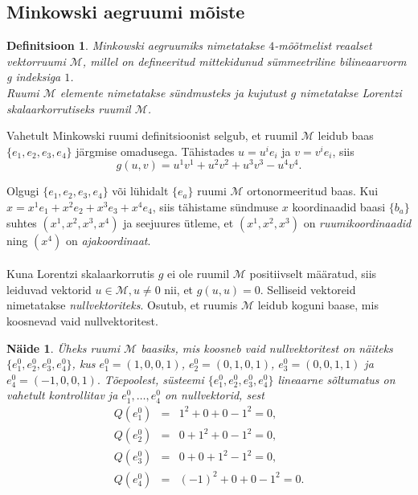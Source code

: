 \documentclass[a4paper,12pt]{article}
\newtheorem{definitsioon}{Definitsioon}[section]
\newtheorem{naide}{Näide}[section]
\numberwithin{equation}{section}
\begin{document}
\subsection{Minkowski aegruumi mõiste}

\begin{definitsioon}
\emph{Minkowski aegruumiks} nimetatakse $4$-mõõtmelist reaalset vektorruumi $\mathcal{M}$, millel on defineeritud mittekidunud sümmeetriline bilineaarvorm g indeksiga $1$. \\
Ruumi $\mathcal{M}$ elemente nimetatakse \emph{sündmusteks} ja kujutust $g$ nimetatakse \emph{Lorentzi skalaarkorrutiseks} ruumil $\mathcal{M}$.
\end{definitsioon}
Vahetult Minkowski ruumi definitsioonist selgub, et ruumil $\mathcal{M}$ leidub baas $\{e_1, e_2, e_3, e_4\}$ järgmise omadusega. Tähistades $u = u^i e_i$ ja $v = v^i e_i$, siis
\[g\left(u, v\right) = u^1 v^1 + u^2 v^2 + u^3 v^3 - u^4 v^4.\]

Olgugi $\{e_1, e_2, e_3, e_4\}$ või lühidalt $\{e_a\}$ ruumi $\mathcal{M}$ ortonormeeritud baas. 
Kui $x = x^1 e_1 + x^2 e_2 + x^3 e_3 + x^4 e_4$, siis tähistame sündmuse $x$ koordinaadid baasi $\{b_a\}$ suhtes $\left( x^1, x^2, x^3, x^4 \right)$ ja seejuures ütleme, et $\left( x^1, x^2, x^3 \right)$ on \emph{ruumikoordinaadid} ning $\left(x^4\right)$ on \emph{ajakoordinaat}.
\paragraph{}
Kuna Lorentzi skalaarkorrutis $g$ ei ole ruumil $\mathcal{M}$ positiivselt määratud, siis leiduvad vektorid $u \in \mathcal{M}, u \neq 0$ nii, et $g \left(u, u\right) = 0$. Selliseid vektoreid nimetatakse \emph{nullvektoriteks}. Osutub, et ruumis $\mathcal{M}$ leidub koguni baase, mis koosnevad vaid nullvektoritest.

\begin{naide}
Üheks ruumi $\mathcal{M}$ baasiks, mis koosneb vaid nullvektoritest on näiteks $\{e_1^0, e_2^0, e_3^0, e_4^0\}$, kus $e_1^0 = \left(1, 0, 0, 1\right)$, $e_2^0 = \left(0, 1, 0, 1\right)$, $e_3^0 = \left(0, 0, 1, 1\right)$ ja $e_4^0 = \left(-1, 0, 0, 1\right).$
Tõepoolest, süsteemi $\{e_1^0, e_2^0, e_3^0, e_4^0\}$ lineaarne sõltumatus on vahetult kontrollitav ja $e_1^0, \dots, e_4^0$ on nullvektorid, sest
\begin{eqnarray*}
Q\left(e_1^0\right) &=& 1^2 + 0 + 0 - 1^2 = 0, \\
Q\left(e_2^0\right) &=& 0 + 1^2 + 0 - 1^2 = 0, \\
Q\left(e_3^0\right) &=& 0 + 0 + 1^2 - 1^2 = 0, \\
Q\left(e_4^0\right) &=& (-1)^2 + 0 + 0 - 1^2 = 0.
\end{eqnarray*}
\end{naide}
\end{document}

